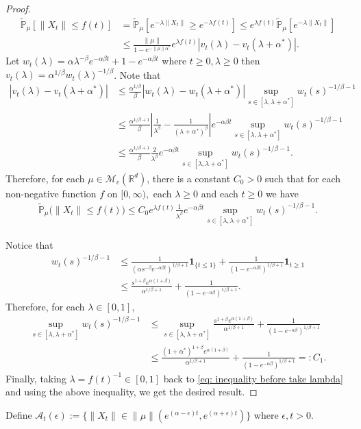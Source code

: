 \documentclass[12pt,oneside,english]{amsart}
\theoremstyle{plain}
\theoremstyle{definition}
\numberwithin{equation}{section}
\begin{document}
\begin{proof}
\begin{align*}
    \mathbb{\tilde{P}}_{\mu}[\|X_t\|\leq f(t)]&=\mathbb{\tilde{P}}_{\mu}[e^{-\lambda\|X_t\|}\geq e^{-\lambda f(t)}]\leq e^{\lambda f(t)}\mathbb{\tilde{P}}_{\mu}[e^{-\lambda \|X_t\|}]\\
    &\leq \frac{\|\mu\|}{1-e^{-\|\mu\|\alpha^*}}e^{\lambda f(t)}\left|v_t(\lambda)-v_t(\lambda+\alpha^*)\right|.
\end{align*}
	Let $w_t(\lambda)=\alpha \lambda^{-\beta}e^{-\alpha \beta t}+1-e^{-\alpha\beta t}$ where $t\geq 0,\lambda\geq0$ then $v_t(\lambda)=\alpha^{1/\beta}w_t(\lambda)^{-1/\beta}$.
Note that
\begin{align*}
    \left|v_t(\lambda)-v_t(\lambda+\alpha^*)\right|&\leq\frac {\alpha^{1/\beta}}{\beta} \left|w_t(\lambda)-w_t(\lambda+\alpha^*)\right| \sup_{s\in [\lambda,\lambda+\alpha^*]}w_t(s)^{-1/\beta-1}\\
    &\leq  \frac{\alpha^{1/\beta+1}}{\beta}\left|\frac{1}{\lambda^{\beta}}-\frac{1}{(\lambda+\alpha^*)^{\beta}}\right|e^{-\alpha\beta t} \sup_{s\in [\lambda,\lambda+\alpha^*]}w_t(s)^{-1/\beta-1}\\
    &\leq  \frac{\alpha^{1/\beta+1}}{\beta}\frac{2}{\lambda^{\beta}}e^{-\alpha\beta t} \sup_{s\in [\lambda,\lambda+\alpha^*]}w_t(s)^{-1/\beta-1}.
\end{align*}
Therefore, for each $\mu\in \mathcal M_c(\mathbb R^d)$, there is a constant $C_0>0$ such that for each non-negative function $f$ on $[0,\infty),$ each $\lambda \geq 0$ and each $t\geq 0$ we have
\begin{align}
\label{eq: inequality before take lambda}
    \mathbb{\tilde{P}}_{\mu}\big(\|X_t\|\leq f(t)\big)
    \leq C_0e^{\lambda f(t)}\frac{1}{\lambda^{\beta}}e^{-\alpha\beta t} \sup_{s\in [\lambda,\lambda+\alpha^*]}w_t(s)^{-1/\beta-1}.
\end{align}

Notice that
\begin{align*}
    w_t(s)^{-1/\beta-1}&\leq \frac{1}{(\alpha s^{-\beta}e^{-\alpha \beta t})^{1/
    \beta+1}}\mathbf{1}_{\{t\leq 1\}}+\frac{1}{(1-e^{-\alpha\beta t})^{1/\beta+1}}\mathbf{1}_{t\geq 1}\\
    &\leq \frac{s^{1+\beta}e^{\alpha(1+\beta)}}{\alpha^{1/\beta +1}}+\frac{1}{(1-e^{-\alpha\beta })^{1/\beta+1}}.
\end{align*}
Therefore, for each $\lambda \in [0,1]$,
\begin{align*}
    \sup_{s\in [\lambda,\lambda+\alpha^*]}w_t(s)^{-1/\beta-1}
    &\leq\sup_{s\in [\lambda,\lambda+\alpha^*]}\frac{s^{1+\beta}e^{\alpha(1+\beta)}}{\alpha^{1/\beta +1}}+\frac{1}{(1-e^{-\alpha\beta })^{1/\beta+1}}\\
    &\leq \frac{(1+\alpha^*)^{1+\beta}e^{\alpha(1+\beta)}}{\alpha^{1/\beta+1}}+\frac{1}{(1-e^{-\alpha\beta })^{1/\beta+1}} =: C_1.
\end{align*}
Finally, taking $\lambda = f(t)^{-1} \in [0,1]$ back to \eqref{eq: inequality before take lambda} and using the above inequality, we get the desired result.
\end{proof}
	Define $\mathcal{A}_t(\epsilon):=\{ \|X_t\|\in \|\mu\|(e^{(\alpha-\epsilon)t},e^{(\alpha+\epsilon)t})\}$ where $\epsilon,t>0$.
\end{document}
